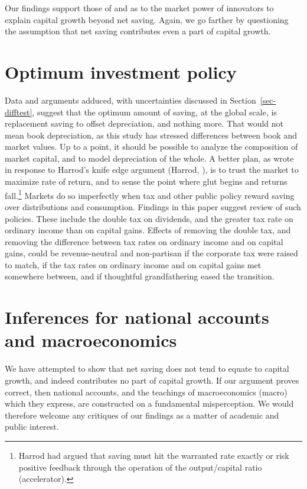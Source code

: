 \documentclass[a4paper,fleqn]{latex_styles/cas-sc}
\begin{document}
Our findings support those of \cite{picketyCapitalIsBack2014} and \cite{kurz2023market} as to the market power of innovators to explain capital growth beyond net saving. Again, we go farther by questioning the assumption that net saving contributes even a part of capital growth.

\hypertarget{optimum-investment-policy}{%
\section{Optimum investment policy}\label{optimum-investment-policy}}

Data and arguments adduced, with uncertainties discussed in Section~\ref{sec-difftest}, suggest that the optimum amount of
saving, at the global scale, is replacement saving to offset depreciation, and nothing
more. That would not mean book depreciation, as this study has stressed
differences between book and market values. Up to a point, it should be
possible to analyze the composition of market capital, and to model
depreciation of the whole. A better plan, as
\citet{solowContributionTheoryEconomic1956a} wrote in response to
Harrod's knife edge argument (Harrod, \citeyear{harrodEssayDynamicTheory1939}), is to
trust the market to maximize rate of return, and to sense the point
where glut begins and returns fall.\footnote{Harrod had argued that
saving must hit the warranted rate exactly or risk positive
feedback through the operation of the output/capital ratio
(accelerator).}
%
Markets do so imperfectly when tax and other public policy reward
saving over distributions and consumption. Findings in this paper
suggest review of such policies. These include the double tax on
dividends, and the greater tax rate on ordinary income than on capital
gains. Effects of removing the double tax, and removing the difference
between tax rates on ordinary income and on capital gains, could be
revenue-neutral and non-partisan if the corporate tax were raised to
match, if the tax rates on ordinary income and on capital gains met
somewhere between, and if thoughtful grandfathering eased the
transition.

\section{Inferences for national accounts and macroeconomics}

We have attempted to show that net saving does not tend to equate to capital growth, and indeed contributes no part of capital growth. If our argument proves correct, then national accounts, and the teachings of macroeconomics (macro) which they express, are constructed on a fundamental misperception. We would therefore welcome any critiques of our findings as a matter of academic and public interest.
\end{document}

